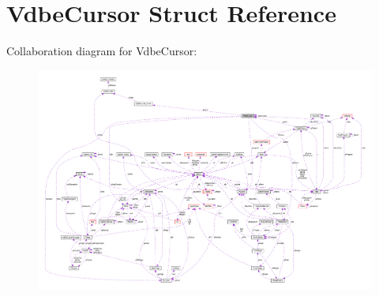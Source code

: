 \hypertarget{structVdbeCursor}{}\section{Vdbe\+Cursor Struct Reference}
\label{structVdbeCursor}


Collaboration diagram for Vdbe\+Cursor\+:\nopagebreak
\begin{figure}[H]
\begin{center}
\leavevmode
\includegraphics[width=350pt]{structVdbeCursor__coll__graph}
\end{center}
\end{figure}
